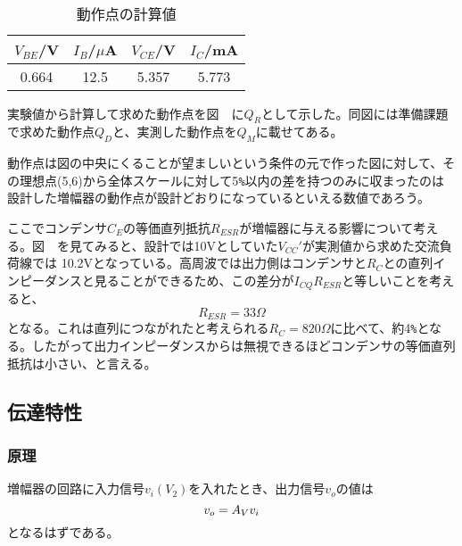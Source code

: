 \documentclass[11pt,a4j,titlepage]{jsarticle}
\begin{document}
　
 
 \begin{table}[htb]
  \begin{center}
    \caption{動作点の計算値}
    \begin{tabular}{cccc} \toprule
$V_{BE}$/V	&	$I_B$/$\mu$A	&	$V_{CE}$/V	&	$I_C$/mA	\\ \midrule
0.664	&	12.5	&	5.357	&	5.773	\\ \bottomrule
    \end{tabular}
    \label{tab:price}
  \end{center}
  \end{table}
  
  
  実験値から計算して求めた動作点を図\ \ に$Q_R$として示した。同図には準備課題で求めた動作点$Q_D$と、実測した動作点を$Q_M$に載せてある。
  
  動作点は図の中央にくることが望ましいという条件の元で作った図に対して、その理想点(5,6)から全体スケールに対して5\verb|%|以内の差を持つのみに収まったのは
  設計した増幅器の動作点が設計どおりになっているといえる数値であろう。
  
  
  
  ここでコンデンサ$C_E$の等価直列抵抗$R_{ESR}$が増幅器に与える影響について考える。図\ \ を見てみると、設計では10Vとしていた$V_{CC}'$が実測値から求めた交流負荷線では
  10.2Vとなっている。高周波では出力側はコンデンサと$R_C$との直列インピーダンスと見ることができるため、この差分が$I_{CQ}R_{ESR}$と等しいことを考えると、
  \begin{equation}
   R_{ESR} = 33 \Omega \nonumber
  \end{equation}
  となる。これは直列につながれたと考えられる$R_C=820\Omega$に比べて、約4\verb|%|となる。したがって出力インピーダンスからは無視できるほどコンデンサの等価直列抵抗は小さい、と言える。

 
   
   \clearpage
  
  \subsection{伝達特性}
 
   \subsubsection{原理}
   
   増幅器の回路に入力信号$v_i(V_2)$を入れたとき、出力信号$v_o$の値は
   \begin{equation}
    v_o = A_V v_i \\
   \end{equation}
   となるはずである。
   
\end{document}
